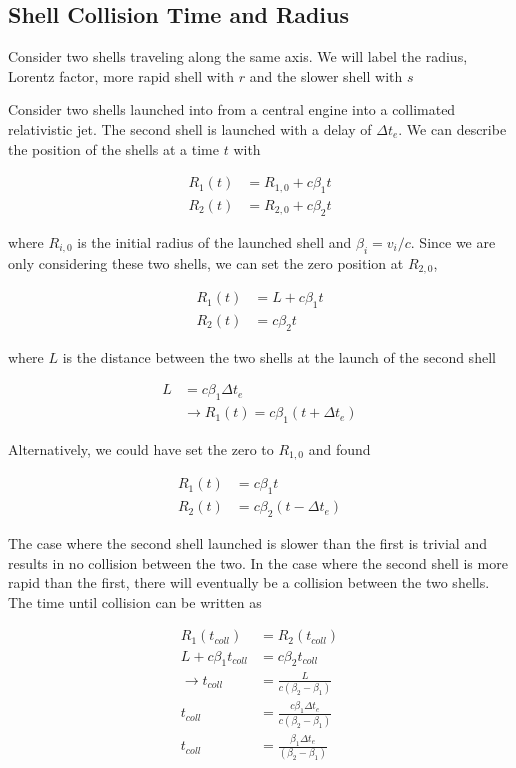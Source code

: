 \documentclass[linenumbers,twocolumn]{aastex631}
\begin{document}
\begin{appendix}

\section{Shell Collision Time and Radius}

Consider two shells traveling along the same axis. We will label the radius, Lorentz factor,  more rapid shell with $r$ and the slower shell with $s$

Consider two shells launched into from a central engine into a collimated relativistic jet. The second shell is launched with a delay of $\Delta t_e$. We can describe the position of the shells at a time $t$ with

\begin{align}
	R_1(t) &= R_{1,0} + c\beta_1 t \\
	R_2(t) &= R_{2,0} + c\beta_2 t
\end{align}

where $R_{i,0}$ is the initial radius of the launched shell and $\beta_i = v_i/c$. Since we are only considering these two shells, we can set the zero position at $R_{2,0}$, 

\begin{align}
	R_1(t) &= L + c\beta_1 t \\
	R_2(t) &= c\beta_2 t
\end{align}

where $L$ is the distance between the two shells at the launch of the second shell

\begin{align}
	L &= c\beta_1 \Delta t_e\\ 
	&\rightarrow R_1(t) = c\beta_1(t+\Delta t_e)
\end{align}

Alternatively, we could have set the zero to $R_{1,0}$ and found 

\begin{align}
	R_1(t) &= c\beta_1 t \\
	R_2(t) &= c\beta_2 (t-\Delta t_e)
\end{align}

The case where the second shell launched is slower than the first is trivial and results in no collision between the two. In the case where the second shell is more rapid than the first, there will eventually be a collision between the two shells. The time until collision can be written as

\begin{align}
	R_1(t_{coll}) &= R_2(t_{coll}) \\ 
	L + c\beta_1t_{coll}&= c\beta_2t_{coll}\\
	\rightarrow t_{coll}&= \frac{L}{c(\beta_2 - \beta_1)}\\
	t_{coll}&= \frac{c\beta_1 \Delta t_e}{c(\beta_2 - \beta_1)}\\
	t_{coll}&= \frac{\beta_1 \Delta t_e}{(\beta_2 - \beta_1)}
\end{align}


\end{appendix}
\end{document}
